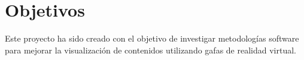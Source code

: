 
\pagestyle{empty}
\chapter {Objetivos}

Este proyecto ha sido creado con el objetivo de investigar metodologías software para mejorar la visualización de contenidos utilizando gafas de realidad virtual.